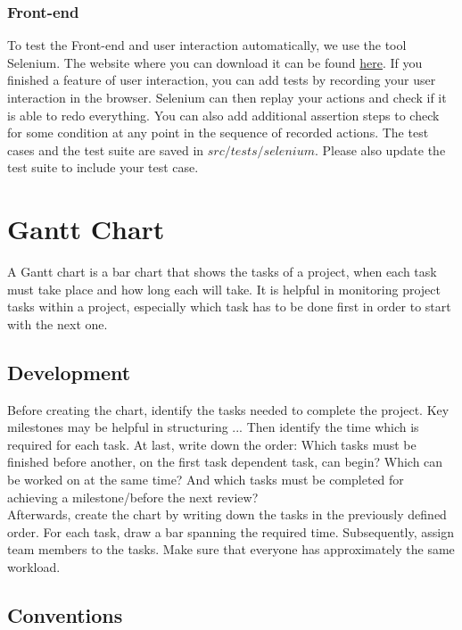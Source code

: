 \documentclass[twoside,12pt,a4paper]{article}
\begin{document}
\subsubsection{Front-end}
To test the Front-end and user interaction automatically, we use the tool Selenium. The website where you can download it can be found \href{http://www.seleniumhq.org/}{here}. If you finished a feature of user interaction, you can add tests by recording your user interaction in the browser. Selenium can then replay your actions and check if it is able to redo everything. You can also add additional assertion steps to check for some condition at any point in the sequence of recorded actions. The test cases and the test suite are saved in $src/tests/selenium$. Please also update the test suite to include your test case.

\newpage

\section{Gantt Chart} %
\label{sec:gantt_chart}

A Gantt chart is a bar chart that shows the tasks of a project, when each task must take place and how long each will take. It is helpful in monitoring project tasks within a project, especially which task has to be done first in order to start with the next one.


\subsection{Development} %
\label{sub:development}
Before creating the chart, identify the tasks needed to complete the project. Key milestones may be helpful in structuring ... Then identify the time which is required for each task. At last, write down the order: Which tasks must be finished before another, on the first task dependent task, can begin? Which can be worked on at the same time? And which tasks must be completed for achieving a milestone/before the next review? \\
Afterwards, create the chart by writing down the tasks in the previously defined order. For each task, draw a bar spanning the required time. Subsequently, assign team members to the tasks. Make sure that everyone has approximately the same workload.



\subsection{Conventions} %
\label{sub:conventions}
\end{document}
